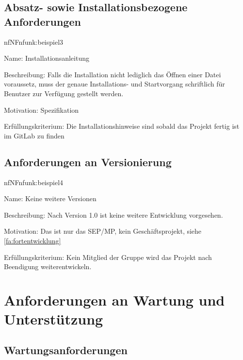 \subsection{Absatz- sowie Installationsbezogene Anforderungen}

\begin{description}[leftmargin=5em, style=sameline]	
	\begin{lhp}{nf}{NF}{nfunk:beispiel3}
		\item [Name:] Installationsanleitung	
		\item [Beschreibung:] Falls die Installation nicht lediglich das Öffnen einer Datei voraussetz, muss der genaue Installations- und Startvorgang schriftlich für Benutzer zur Verfügung gestellt werden.
		\item [Motivation:] Spezifikation
		\item [Erfüllungskriterium:] Die Installationshinweise sind sobald das Projekt fertig ist im GitLab zu finden
	\end{lhp}
\end{description}

\subsection{Anforderungen an Versionierung}

\begin{description}[leftmargin=5em, style=sameline]	
	\begin{lhp}{nf}{NF}{nfunk:beispiel4}
		\item [Name:] Keine weitere Versionen
		\item [Beschreibung:] Nach Version 1.0 ist keine weitere Entwicklung vorgesehen.
		\item [Motivation:] Das ist nur das SEP/MP, kein Geschäftsprojekt, siehe \ref{fa:fortentwicklung}
		\item [Erfüllungskriterium:] Kein Mitglied der Gruppe wird das Projekt nach Beendigung weiterentwickeln.
	\end{lhp}
\end{description}

\section{Anforderungen an Wartung und Unterstützung}

\subsection{Wartungsanforderungen}

